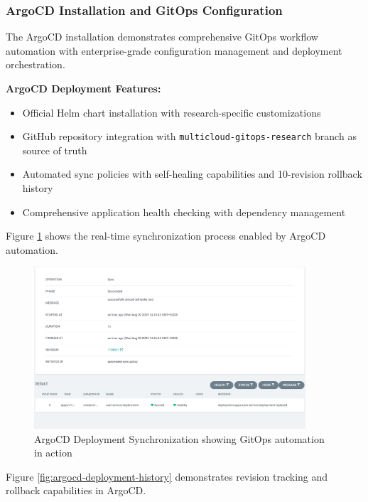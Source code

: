 \subsubsection{ArgoCD Installation and GitOps Configuration}

The ArgoCD installation demonstrates comprehensive GitOps workflow automation with enterprise-grade configuration management and deployment orchestration.

\textbf{ArgoCD Deployment Features:}
\begin{itemize}
\item Official Helm chart installation with research-specific customizations
\item GitHub repository integration with \texttt{multicloud-gitops-research} branch as source of truth
\item Automated sync policies with self-healing capabilities and 10-revision rollback history
\item Comprehensive application health checking with dependency management
\end{itemize}

Figure \ref{fig:argocd-deployment-sync} shows the real-time synchronization process enabled by ArgoCD automation.

\begin{figure}[H]
\centering
\includegraphics[width=0.9\textwidth]{figures/chapter5/argocd-deployment-sync.png}
\caption{ArgoCD Deployment Synchronization showing GitOps automation in action}
\label{fig:argocd-deployment-sync}
\end{figure}

Figure \ref{fig:argocd-deployment-history} demonstrates revision tracking and rollback capabilities in ArgoCD.

